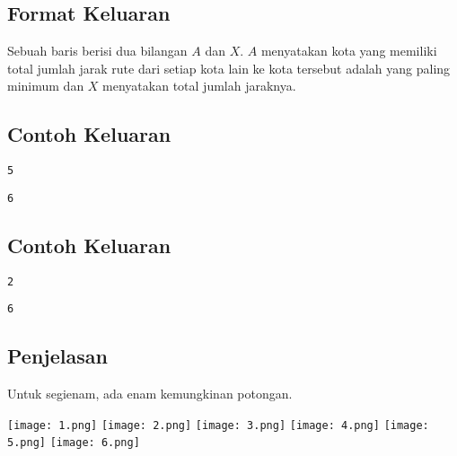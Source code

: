 \documentclass{article}
\begin{document}
\subsection*{Format Keluaran}
Sebuah baris berisi dua bilangan $A$ dan $X$. $A$ menyatakan kota yang memiliki total jumlah jarak rute dari setiap kota lain ke kota tersebut adalah yang paling minimum dan $X$ menyatakan total jumlah jaraknya. 
\\

\begin{multicols}{2}
\subsection*{Contoh Keluaran}
\begin{lstlisting}
5
\end{lstlisting}
\begin{lstlisting}
6
\end{lstlisting}
\columnbreak
\subsection*{Contoh Keluaran}
\begin{lstlisting}
2
\end{lstlisting}
\begin{lstlisting}
6
\end{lstlisting}
\end{multicols}

\subsection*{Penjelasan}
Untuk segienam, ada enam kemungkinan potongan.

\texttt{[image: 1.png]}
\texttt{[image: 2.png]}
\texttt{[image: 3.png]}
\texttt{[image: 4.png]}
\texttt{[image: 5.png]}
\texttt{[image: 6.png]}


\pagebreak
\end{document}
